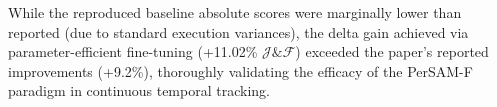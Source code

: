 \documentclass[journal,12pt,onecolumn,draftclsnofoot]{IEEEtran}
\begin{document}
\begin{table}[htbp]
\centering
\caption{DAVIS-2017: Global Validation Results (Reproduced vs Paper)}
\label{tab:davis_global}
\end{table}

While the reproduced baseline absolute scores were marginally lower than reported (due to standard execution variances), the delta gain achieved via parameter-efficient fine-tuning (+11.02\% $\mathcal{J}\&\mathcal{F}$) exceeded the paper's reported improvements (+9.2\%), thoroughly validating the efficacy of the PerSAM-F paradigm in continuous temporal tracking.
\end{document}
